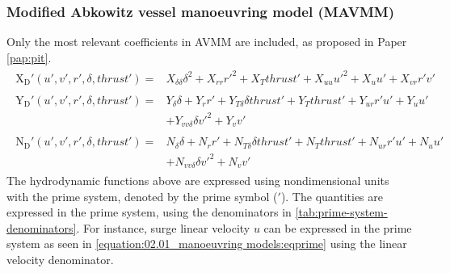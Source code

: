 \subsubsection*{\normalfont \textbf{Modified Abkowitz vessel manoeuvring model (MAVMM)}}
\newline
Only the most relevant coefficients in AVMM are included, as proposed in Paper \ref{pap:pit}.
\begin{equation}\label{equation:02.01_manoeuvring models:eqxmartinssimple}
\begin{split}\begin{split}
\operatorname{X_{D}'}{\left(u',v',r',\delta,thrust' \right)} = & X_{\delta\delta} \delta^{2} + X_{rr} r'^{2} + X_{T} thrust' + X_{uu} u'^{2} + X_{u} u' + X_{vr} r' v' 
\end{split}\end{split}
\end{equation}\begin{equation}\label{equation:02.01_manoeuvring models:eqymartinssimple}
\begin{split}\begin{split}
\operatorname{Y_{D}'}{\left(u',v',r',\delta,thrust' \right)} = & Y_{\delta} \delta + Y_{r} r' + Y_{T\delta} \delta thrust' + Y_{T} thrust' + Y_{ur} r' u' + Y_{u} u' \\ & + Y_{vv\delta} \delta v'^{2} + Y_{v} v' 
\end{split}\end{split}
\end{equation}\begin{equation}\label{equation:02.01_manoeuvring models:eqnmartinssimple}
\begin{split}\begin{split}
\operatorname{N_{D}'}{\left(u',v',r',\delta,thrust' \right)} = & N_{\delta} \delta + N_{r} r' + N_{T\delta} \delta thrust' + N_{T} thrust' + N_{ur} r' u' + N_{u} u' \\ & + N_{vv\delta} \delta v'^{2} + N_{v} v' 
\end{split}\end{split}
\end{equation}
\sphinxAtStartPar
The hydrodynamic functions above are expressed using nondimensional units with the prime system, denoted by the prime symbol (\('\)). The quantities are expressed in the prime system, using the denominators in \autoref{tab:prime-system-denominators}. For instance, surge linear velocity \(u\) can be expressed in the prime system as seen in \autoref{equation:02.01_manoeuvring models:eqprime} using the linear velocity denominator.
